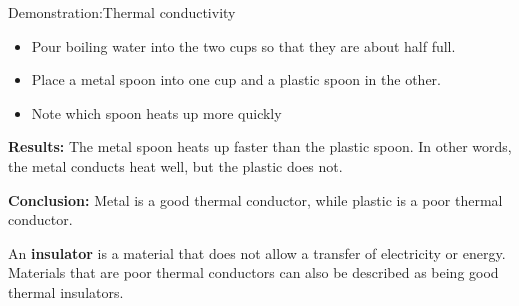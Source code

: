 \begin{g_experiment}{Demonstration:Thermal conductivity}
{\label{m38706*id66609}\begin{itemize}[noitemsep]
\label{m38706*uid102}\item Pour boiling water into the two cups so that they are about half full.
\label{m38706*uid103}\item Place a metal spoon into one cup and a plastic spoon in the other.
\label{m38706*uid104}\item Note which spoon heats up more quickly
\end{itemize}
        \par 
\label{m38706*eip-270}
	\par
      \label{m38706*id66666}\noindent{}\textbf{Results: }\newline
    The metal spoon heats up faster than the plastic spoon. In other words, the metal conducts heat well, but the plastic does not.\par 
\label{m38706*id66687}\noindent{}\textbf{Conclusion: }Metal is a good thermal conductor, while plastic is a poor thermal conductor.}
\end{g_experiment}
 \par 
      \label{m38706*id66699}An \textbf{insulator} is a material that does not allow a transfer of electricity or energy. Materials that are poor thermal conductors can also be described as being good thermal insulators.\par 
